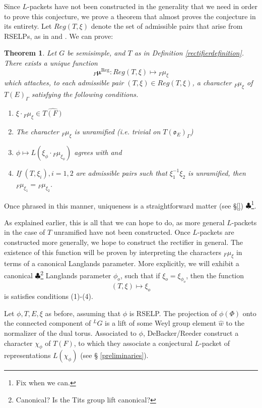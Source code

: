 \documentclass[11pt]{amsart}
\theoremstyle{plain}
\newtheorem{theorem}{Theorem}[section]
\newcommand{\MAxxx}[1]{$\clubsuit$\footnote{#1}}
\theoremstyle{definition}
\begin{document}
Since $L$-packets have not been constructed in the generality that 
we need in order to prove this conjecture, we prove a theorem that 
almost proves the conjecture in its entirety.  Let $Reg(T, \xi)$ denote 
the set of admissible pairs that arise from RSELPs,
as in \cite{debackerreeder} and \cite{reeder}.  We can prove:

\begin{theorem}\label{regularrectifierdefinition}
Let $G$ be semisimple, and $T$ as in Definition \ref{rectifierdefinition}.
There exists a unique function $${}_F
  \boldsymbol\mu^{\mathrm{Reg}} : Reg(T, \xi) \mapsto {}_F \mu_{\xi}$$ which attaches,
  to each admissible pair $(T, \xi) \in Reg(T,\xi)$, a character ${}_F
  \mu_{\xi}$ of $T(E)_{\Gamma}$ satisfying the following conditions.

\begin{enumerate}
\item $\xi \cdot {}_F \mu_{\xi} \in \widehat{T(F)}$

\item The character ${}_F \mu_{\xi}$ is unramified (i.e. trivial on
  $T(\mathfrak{o}_E)_{\Gamma}$)

\item $\phi \mapsto L(\xi_{\phi} \cdot {}_F \mu_{\xi_{\phi}})$
  agrees with \cite{debackerreeder} and \cite{reeder}

\item If $(T, \xi_i), i = 1,2$ are admissible pairs  such that
$\xi_1^{-1} \xi_2$ is unramified, then
${}_F \mu_{\xi_1} = {}_F \mu_{\xi_2}$.
\end{enumerate}
\end{theorem}

Once phrased in this manner, uniqueness is a straightforward matter
(see \S\ref{}) \MAxxx{Fix when we can.}.

As explained earlier, this is all that we can hope to do,
as more general $L$-packets in the case of $T$ unramified have not been
constructed.  Once $L$-packets are constructed more generally, we hope to
construct the rectifier in general.  The existence of this function
will be proven by interpreting the characters ${}_F \mu_{\xi}$
in terms of a canonical Langlands parameter.  More explicitly,
we will exhibit a canonical
\MAxxx{Canonical?  Is the Tits group lift canonical?} Langlands
parameter $\phi_{o}$, such that if $\xi_o = \xi_{\phi_o}$, then the
function $$(T, \xi) \mapsto \xi_o$$ is satisfies conditions (1)-(4).

Let $\phi, T, E, \xi$ as before, assuming that $\phi$ is RSELP.
The projection of $\phi(\Phi)$ onto the connected component of ${}^L
G$ is a lift of some Weyl group element $\hat{w}$ to the normalizer of
the dual torus.  Associated to $\phi$, DeBacker/Reeder construct a
character $\chi_{\phi}$ of $T(F)$, to which they associate a
conjectural $L$-packet of representations $L(\chi_{\phi})$ (see \S
\ref{preliminaries}).
\end{document}
